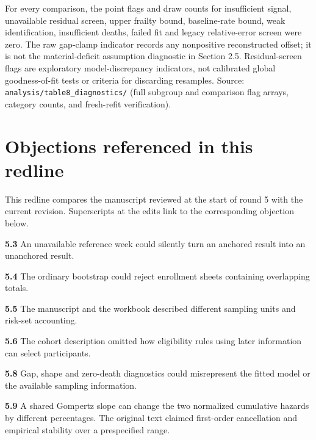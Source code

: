 \documentclass[
]{article}
\begin{document}
For every comparison, the point flags and draw counts for insufficient signal, unavailable residual screen, upper frailty bound, baseline-rate bound, weak identification, insufficient deaths, failed fit and legacy relative-error screen were zero. The raw gap-clamp indicator records any nonpositive reconstructed offset; it is not the material-deficit assumption diagnostic in Section 2.5. Residual-screen flags are exploratory model-discrepancy indicators, not calibrated global goodness-of-fit tests or criteria for discarding resamples. Source: \texttt{analysis/table8\_diagnostics/} (full subgroup and comparison flag arrays, category counts, and fresh-refit verification).
\endgroup

\clearpage\section*{Objections referenced in this redline}
This redline compares the manuscript reviewed at the start of round 5 with the current revision. Superscripts at the edits link to the corresponding objection below.

\hypertarget{issue-5.3}{}\textbf{5.3} An unavailable reference week could silently turn an anchored result into an unanchored result.

\hypertarget{issue-5.4}{}\textbf{5.4} The ordinary bootstrap could reject enrollment sheets containing overlapping totals.

\hypertarget{issue-5.5}{}\textbf{5.5} The manuscript and the workbook described different sampling units and risk-set accounting.

\hypertarget{issue-5.6}{}\textbf{5.6} The cohort description omitted how eligibility rules using later information can select participants.

\hypertarget{issue-5.8}{}\textbf{5.8} Gap, shape and zero-death diagnostics could misrepresent the fitted model or the available sampling information.

\hypertarget{issue-5.9}{}\textbf{5.9} A shared Gompertz slope can change the two normalized cumulative hazards by different percentages. The original text claimed first-order cancellation and empirical stability over a prespecified range.
\end{document}
